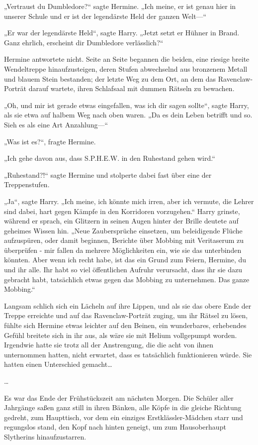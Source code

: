 {„Vertraust du Dumbledore?“ sagte Hermine. „Ich meine, er ist genau hier in unserer Schule und er ist der legendärste Held der ganzen Welt—“

„Er war der legendärste Held“, sagte Harry. „Jetzt setzt er Hühner in Brand. Ganz ehrlich, erscheint dir Dumbledore verlässlich?“

Hermine antwortete nicht. Seite an Seite begannen die beiden, eine riesige breite Wendeltreppe hinaufzusteigen, deren Stufen abwechselnd aus bronzenem Metall und blauem Stein bestanden; der letzte Weg zu dem Ort, an dem das Ravenclaw-Porträt darauf wartete, ihren Schlafsaal mit dummen Rätseln zu bewachen.

„Oh, und mir ist gerade etwas eingefallen, was ich dir sagen sollte“, sagte Harry, als sie etwa auf halbem Weg nach oben waren. „Da es dein Leben betrifft und so. Sieh es als eine Art Anzahlung—“

„Was ist es?“, fragte Hermine.

„Ich gehe davon aus, dass S.P.H.E.W. in den Ruhestand gehen wird.“

„Ruhestand?!“ sagte Hermine und stolperte dabei fast über eine der Treppenstufen.

„Ja“, sagte Harry. „Ich meine, ich könnte mich irren, aber ich vermute, die Lehrer sind dabei, hart gegen Kämpfe in den Korridoren vorzugehen.“ Harry grinste, während er sprach, ein Glitzern in seinen Augen hinter der Brille deutete auf geheimes Wissen hin. „Neue Zaubersprüche einsetzen, um beleidigende Flüche aufzuspüren, oder damit beginnen, Berichte über Mobbing mit Veritaserum zu überprüfen - mir fallen da mehrere Möglichkeiten ein, wie sie das unterbinden könnten. Aber wenn ich recht habe, ist das ein Grund zum Feiern, Hermine, du und ihr alle. Ihr habt so viel öffentlichen Aufruhr verursacht, dass ihr sie dazu gebracht habt, tatsächlich etwas gegen das Mobbing zu unternehmen. Das ganze Mobbing.“

Langsam schlich sich ein Lächeln auf ihre Lippen, und als sie das obere Ende der Treppe erreichte und auf das Ravenclaw-Porträt zuging, um ihr Rätsel zu lösen, fühlte sich Hermine etwas leichter auf den Beinen, ein wunderbares, erhebendes Gefühl breitete sich in ihr aus, als wäre sie mit Helium vollgepumpt worden. Irgendwie hatte sie trotz all der Anstrengung, die die acht von ihnen unternommen hatten, nicht erwartet, dass es tatsächlich funktionieren würde. Sie hatten einen Unterschied gemacht…

…

Es war das Ende der Frühstückszeit am nächsten Morgen. Die Schüler aller Jahrgänge saßen ganz still in ihren Bänken, alle Köpfe in die gleiche Richtung gedreht, zum Haupttisch, vor dem ein einziges Erstklässler-Mädchen starr und regungslos stand, den Kopf nach hinten geneigt, um zum Hausoberhaupt Slytherins hinaufzustarren.

}

